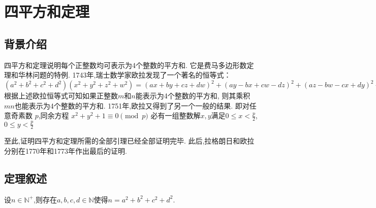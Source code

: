 \documentclass[main]{subfiles}
\begin{document}
\renewcommand{\filename}{No.10Theorem}%
\section{四平方和定理}
\subsection{背景介绍}
四平方和定理说明每个正整数均可表示为4个整数的平方和.
它是费马多边形数定理和华林问题的特例.
1743年,瑞士数学家欧拉发现了一个著名的恒等式：
\((a^2+b^2+c^2+d^2)(x^2+y^2+z^2+w^2)=(ax+by+cz+dw)^2+(ay-bx+cw-dz)^2+(az-bw-cx+dy)^2+(aw+bz-cy-dx)^2\)
根据上述欧拉恒等式可知如果正整数\(m\)和\(n\)能表示为4个整数的平方和,
则其乘积\(mn\)也能表示为4个整数的平方和.
1751年,欧拉又得到了另一个一般的结果.
即对任意奇素数 \(p\),同余方程
\(x^2+y^2+1 \equiv 0\pmod p\)
必有一组整数解\(x,y\)满足\(0 \le x<\frac{p}{2}\),\(0 \le y<\frac{p}{2}\)

至此,证明四平方和定理所需的全部引理已经全部证明完毕.
此后,拉格朗日和欧拉分别在1770年和1773年作出最后的证明.

\subsection{定理叙述}
\begin{theorem}\label{the:1}
	设\(n \in \mathbb{N}^+\),则存在\(a,b,c,d \in \mathbb{N}\)使得\(n=a^2 +b^2 + c^2 + d^2\).
\end{theorem}
\end{document}
